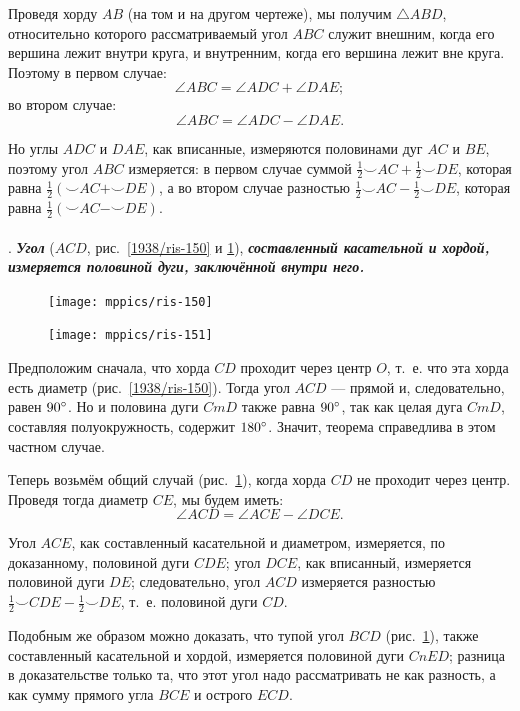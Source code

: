\documentclass[oneside]{book}
\begin{document}
Проведя хорду $AB$ (на том и на другом чертеже), мы получим $\triangle ABD$, относительно которого рассматриваемый угол $ABC$ служит внешним, когда его вершина лежит внутри круга, и внутренним, когда его вершина лежит вне круга.
Поэтому в первом случае:
\[\angle ABC = \angle ADC+\angle DAE;\]
во втором случае:
\[\angle ABC = \angle ADC-\angle DAE.\]

Но углы $ADC$ и $DAE$, как вписанные, измеряются половинами дуг $AC$ и $BE$, поэтому угол $ABC$ измеряется:
в первом случае суммой
$\tfrac12{\smallsmile}AC+\tfrac12{\smallsmile}DE$, которая равна $\tfrac12({\smallsmile}AC+{\smallsmile}DE)$, а во втором случае разностью $\tfrac12{\smallsmile}AC-\tfrac12{\smallsmile}DE$, которая равна $\tfrac12({\smallsmile}AC-{\smallsmile}DE)$.

\paragraph{}\label{1938/131}
.
\textbf{\emph{Угол}} ($ACD$, рис.~\ref{1938/ris-150} и \ref{1938/ris-151}), \textbf{\emph{составленный касательной и хордой, измеряется половиной дуги, заключённой внутри него.}}

\begin{figure}
\centering
\texttt{[image: mppics/ris-150]}
\caption{}\label{1938/ris-150}
\bigskip
\texttt{[image: mppics/ris-151]}
\caption{}\label{1938/ris-151}
\end{figure}

Предположим сначала, что хорда $CD$ проходит через центр $O$, т.~е. что эта хорда есть диаметр (рис.~\ref{1938/ris-150}).
Тогда угол $ACD$ — прямой и,
следовательно, равен $90\degree$.
Но и половина дуги $CmD$ также равна $90\degree$, так как целая дуга $CmD$, составляя полуокружность, содержит $180\degree$.
Значит, теорема справедлива в этом частном случае.

Теперь возьмём общий случай (рис.~\ref{1938/ris-151}), когда хорда $CD$ не проходит через центр.
Проведя тогда диаметр $CE$, мы будем иметь:
\[\angle ACD = \angle ACE - \angle DCE.\]

Угол $ACE$, как составленный касательной и диаметром, измеряется, по доказанному, половиной дуги $CDE$;
угол $DCE$, как вписанный, измеряется половиной дуги $DE$;
следовательно, угол $ACD$ измеряется разностью $\tfrac12{\smallsmile}CDE-\tfrac12{\smallsmile}DE$, т.~е. половиной дуги $CD$.

Подобным же образом можно доказать, что тупой угол $BCD$ (рис.~\ref{1938/ris-151}), также составленный касательной и хордой, измеряется половиной дуги $CnED$;
разница в доказательстве только та, что этот угол надо рассматривать не как разность, а как сумму прямого угла $BCE$ и острого $ECD$.
\end{document}
